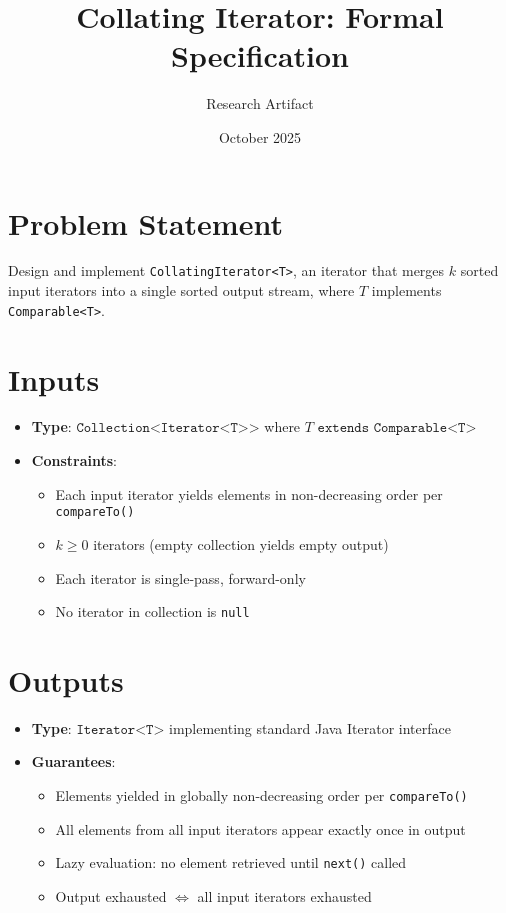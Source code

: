 \documentclass[11pt]{article}
\title{Collating Iterator: Formal Specification}
\author{Research Artifact}
\date{October 2025}
\begin{document}
\maketitle

\section{Problem Statement}

Design and implement \texttt{CollatingIterator<T>}, an iterator that merges $k$ sorted input iterators into a single sorted output stream, where $T$ implements \texttt{Comparable<T>}.

\section{Inputs}

\begin{itemize}
    \item \textbf{Type}: $\texttt{Collection<Iterator<T>>}$ where $T \texttt{ extends Comparable<T>}$
    \item \textbf{Constraints}:
    \begin{itemize}
        \item Each input iterator yields elements in non-decreasing order per \texttt{compareTo()}
        \item $k \geq 0$ iterators (empty collection yields empty output)
        \item Each iterator is single-pass, forward-only
        \item No iterator in collection is \texttt{null}
    \end{itemize}
\end{itemize}

\section{Outputs}

\begin{itemize}
    \item \textbf{Type}: $\texttt{Iterator<T>}$ implementing standard Java Iterator interface
    \item \textbf{Guarantees}:
    \begin{itemize}
        \item Elements yielded in globally non-decreasing order per \texttt{compareTo()}
        \item All elements from all input iterators appear exactly once in output
        \item Lazy evaluation: no element retrieved until \texttt{next()} called
        \item Output exhausted $\Leftrightarrow$ all input iterators exhausted
    \end{itemize}
\end{itemize}
\end{document}
